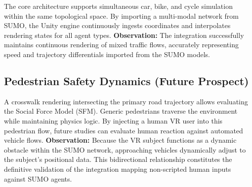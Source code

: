 The core architecture supports simultaneous car, bike, and cycle simulation within the same topological space. By importing a multi-modal network from SUMO, the Unity engine continuously ingests coordinates and interpolates rendering states for all agent types.
\textbf{Observation:} 
The integration successfully maintains continuous rendering of mixed traffic flows, accurately representing speed and trajectory differentials imported from the SUMO models.

\subsection{Pedestrian Safety Dynamics (Future Prospect)}

A crosswalk rendering intersecting the primary road trajectory allows evaluating the Social Force Model (SFM). Generic pedestrians traverse the environment while maintaining physics logic. By injecting a human VR user into this pedestrian flow, future studies can evaluate human reaction against automated vehicle flows.
\textbf{Observation:} 
Because the VR subject functions as a dynamic obstacle within the SUMO network, approaching vehicles dynamically adjust to the subject's positional data. This bidirectional relationship constitutes the definitive validation of the integration mapping non-scripted human inputs against SUMO agents.

